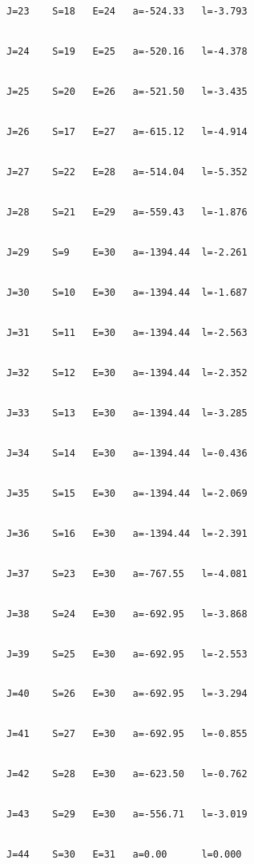 \begin{verbatim}
J=23    S=18   E=24   a=-524.33   l=-3.793  


J=24    S=19   E=25   a=-520.16   l=-4.378  


J=25    S=20   E=26   a=-521.50   l=-3.435  


J=26    S=17   E=27   a=-615.12   l=-4.914  


J=27    S=22   E=28   a=-514.04   l=-5.352  


J=28    S=21   E=29   a=-559.43   l=-1.876  


J=29    S=9    E=30   a=-1394.44  l=-2.261  


J=30    S=10   E=30   a=-1394.44  l=-1.687  


J=31    S=11   E=30   a=-1394.44  l=-2.563  


J=32    S=12   E=30   a=-1394.44  l=-2.352  


J=33    S=13   E=30   a=-1394.44  l=-3.285  


J=34    S=14   E=30   a=-1394.44  l=-0.436  


J=35    S=15   E=30   a=-1394.44  l=-2.069  


J=36    S=16   E=30   a=-1394.44  l=-2.391  


J=37    S=23   E=30   a=-767.55   l=-4.081  


J=38    S=24   E=30   a=-692.95   l=-3.868  


J=39    S=25   E=30   a=-692.95   l=-2.553  


J=40    S=26   E=30   a=-692.95   l=-3.294  


J=41    S=27   E=30   a=-692.95   l=-0.855  


J=42    S=28   E=30   a=-623.50   l=-0.762  


J=43    S=29   E=30   a=-556.71   l=-3.019  


J=44    S=30   E=31   a=0.00      l=0.000   


\end{verbatim}
















